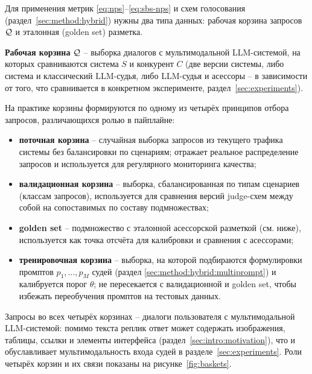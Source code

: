 Для применения метрик \eqref{eq:nps}--\eqref{eq:sbs-nps} и схем
голосования (раздел~\ref{sec:method:hybrid}) нужны два типа данных:
рабочая корзина запросов $\mathcal{Q}$ и эталонная (golden set) разметка.

\textbf{Рабочая корзина} $\mathcal{Q}$ -- выборка диалогов с мультимодальной
LLM-системой, на которых сравниваются система $S$ и конкурент $C$ (две
версии системы, либо система и классический LLM-судья, либо LLM-судья и
асессоры -- в зависимости от того, что сравнивается в конкретном
эксперименте, раздел~\ref{sec:experiments}).

На практике корзины формируются по одному из четырёх принципов отбора
запросов, различающихся ролью в пайплайне:
\begin{itemize}
    \item \textbf{поточная корзина} -- случайная выборка запросов из
        текущего трафика системы без балансировки по сценариям; отражает
        реальное распределение запросов и используется для регулярного
        мониторинга качества;
    \item \textbf{валидационная корзина} -- выборка, сбалансированная по
        типам сценариев (классам запросов), используется для сравнения
        версий judge-схем между собой на сопоставимых по составу
        подмножествах;
    \item \textbf{golden set} -- подмножество с эталонной асессорской
        разметкой (см. ниже), используется как точка отсчёта для
        калибровки и сравнения с асессорами;
    \item \textbf{тренировочная корзина} -- выборка, на которой подбираются
        формулировки промптов $p_1, \dots, p_M$ судей (раздел
        \ref{sec:method:hybrid:multiprompt}) и калибруется порог $\theta$;
        не пересекается с валидационной и golden set, чтобы избежать
        переобучения промптов на тестовых данных.
\end{itemize}
Запросы во всех четырёх корзинах -- диалоги пользователя с мультимодальной
LLM-системой: помимо текста реплик ответ может содержать изображения,
таблицы, ссылки и элементы интерфейса (раздел~\ref{sec:intro:motivation}),
что и обуславливает мультимодальность входа судей в
разделе~\ref{sec:experiments}.
Роли четырёх корзин и их связи показаны на
рисунке~\ref{fig:baskets}.

